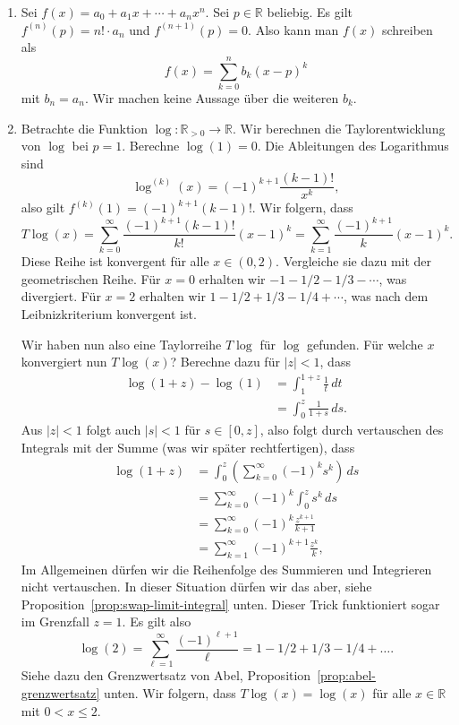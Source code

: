 \documentclass[../main.tex]{subfiles}
\begin{document}
\begin{examples}
  \leavevmode
  \begin{enumerate}[(1)]
    \item Sei $f(x) = a_0 + a_1 x + \cdots + a_n x^n$.
      Sei $p \in \mathbb{R}$ beliebig.
      Es gilt $f^{(n)}(p) = n! \cdot a_n$ und
      $f^{(n+1)}(p) = 0$. Also kann man $f(x)$ schreiben als
      \[
        f(x) = \sum_{k=0}^{n} b_k {(x - p)}^k
      \]
      mit $b_n = a_n$. Wir machen keine Aussage über die weiteren $b_k$.
    \item Betrachte die Funktion  $\log \colon \mathbb{R}_{>0} \to \mathbb{R}$.
      Wir berechnen die Taylorentwicklung von $\log$ bei $p = 1$.
      Berechne $\log(1) = 0$. Die Ableitungen des Logarithmus sind
      \[
        \log^{(k)}(x) = {(-1)}^{k+1} \frac{(k-1)!}{x^k},
      \]
      also gilt $f^{(k)}(1) = {(-1)}^{k+1} (k-1)!$.
      Wir folgern, dass
      \[
        T\log(x) = \sum_{k=0}^{\infty} \frac{{(-1)}^{k+1}(k-1)!}{k!}{(x-1)}^k
        = \sum_{k=1}^{\infty} \frac{{(-1)}^{k+1}}{k}{(x-1)}^k.
      \]
      Diese Reihe ist konvergent für alle $x \in (0, 2)$.
      Vergleiche sie dazu mit der geometrischen Reihe.
      Für $x = 0$ erhalten wir $-1 -1/2 - 1/3 - \cdots$, was divergiert.
      Für $x = 2$ erhalten wir $1 - 1/2 + 1/3 - 1/4 + \cdots$, was nach
      dem Leibnizkriterium konvergent ist.

      Wir haben nun also eine Taylorreihe $T\log$ für $\log$ gefunden.
      Für welche $x$ konvergiert nun $T\log(x)$?
      Berechne dazu für $|z| < 1$, dass
      \begin{align*}
         \log(1 + z) - \log(1)
         &= \int_{1}^{1+z} \frac{1}{t} \, dt  \\
         &= \int_{0}^{z} \frac{1}{1+s} \, ds.
      \end{align*}
      Aus $|z| < 1$ folgt auch $|s| < 1$ für $s \in [0, z]$, also folgt
      durch vertauschen des Integrals mit der Summe (was wir später rechtfertigen),
      dass
      \begin{align*}
        \log(1+z)
        & = \int_{0}^{z} \left( \sum_{k=0}^{\infty} {(-1)}^k s^k \right) \, ds\\
        &= \sum_{k=0}^{\infty} {(-1)}^k \int_{0}^{z} s^k \, ds\\
        &= \sum_{k=0}^{\infty} {(-1)}^k \frac{z^{k+1}}{k+1}\\
        &= \sum_{k=1}^{\infty} {(-1)}^{k+1} \frac{z^k}{k},
      \end{align*}
      Im Allgemeinen dürfen wir die Reihenfolge des Summieren und Integrieren
      nicht vertauschen. In dieser Situation dürfen wir das aber, 
      siehe
      Proposition~\ref{prop:swap-limit-integral} unten.
      Dieser Trick funktioniert sogar im Grenzfall $z = 1$. Es gilt also
      \[
        \log(2) = \sum_{\ell = 1}^{\infty} \frac{{(-1)}^{\ell+1}}{\ell}
        = 1 - 1/2 + 1/3 - 1/4 + \dots.
      \]
      Siehe dazu den Grenzwertsatz von Abel, Proposition~\ref{prop:abel-grenzwertsatz} unten.
      Wir folgern, dass $T\log(x) = \log(x)$ für alle $x \in \mathbb{R}$
      mit $0 < x \leq 2$.
  \end{enumerate}
\end{examples}
\end{document}

